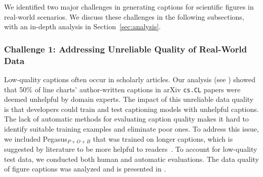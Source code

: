 
We identified two major challenges in generating captions for scientific figures in real-world scenarios.
We discuss these challenges in the following subsections, with an in-depth analysis in Section~\ref{sec:analysis}.


\subsubsection{Challenge 1: Addressing Unreliable Quality of Real-World Data}
Low-quality captions often occur in scholarly articles.
Our analysis (see ) showed that 50\% of line charts' author-written captions in arXiv {\tt cs.CL} papers were deemed unhelpful by domain experts.
The impact of this unreliable data quality is that developers could train and test captioning models with unhelpful captions.
The lack of automatic methods for evaluating caption quality makes it hard to identify suitable training examples and eliminate poor ones.
To address this issue, 
we included Pegasus$_{P+O+B}$ that was trained on longer captions, which is suggested by literature to be more helpful to readers~\cite{hartley2003single,gelman2002let}.
To account for low-quality test data, we conducted both human and automatic evaluations.
The data quality of figure captions was analyzed and is presented in .


